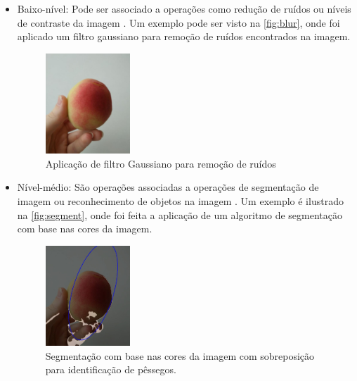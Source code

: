 \begin{itemize}
\item Baixo-nível: 
	Pode ser associado a operações como redução de ruídos ou níveis de contraste da imagem \cite{marengoni:2009}. Um exemplo pode ser visto na \autoref{fig:blur}, onde foi aplicado um filtro gaussiano para remoção de ruídos encontrados na imagem. 
	
   \begin{figure}[ht]
	\caption{\label{fig:blur}Aplicação de filtro Gaussiano para remoção de ruídos}
	\begin{center}
	    \includegraphics[width=0.3\textwidth]{peachs/blur}
	\end{center}
\end{figure} 

\item Nível-médio:
	São operações associadas a operações de segmentação de imagem ou reconhecimento de objetos na imagem \cite{marengoni:2009}. Um exemplo é ilustrado na \autoref{fig:segment}, onde foi feita a aplicação de um algoritmo de segmentação com base nas cores da imagem.
	
       \begin{figure}[ht]
	\caption{\label{fig:segment}Segmentação com base nas cores da imagem com sobreposição para identificação de pêssegos.}
	\begin{center}
	    \includegraphics[width=0.3\textwidth]{peachs/identified}
	\end{center}
\end{figure}


\end{itemize}
